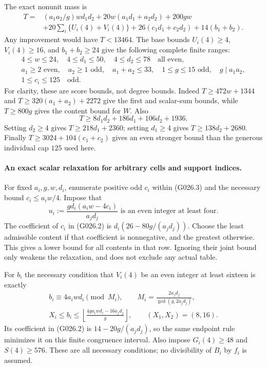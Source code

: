 The exact nonunit mass is
\[
 \begin{split}
 T={}&(a_1a_2/g)wd_1d_2+20w(a_1d_1+a_2d_2)+200gw\\
 &+20\sum_i\{U_i(4)+V_i(4)\}
       +26(c_1d_1+c_2d_2)+14(b_1+b_2).
 \end{split}                                                        \tag{G026.2}
\]
Any improvement would have $T<13464$. The base bounds
$U_i(4)\ge4$, $V_i(4)\ge16$, and $b_1+b_2\ge24$
give the following complete finite ranges:
\[
 \begin{gathered}
 4\le w\le24,\quad4\le d_1\le50,\quad4\le d_2\le78
       \quad\text{all even},\\
 a_1\ge2\text{ even},\quad a_2\ge1\text{ odd},\quad
 a_1+a_2\le33,\quad1\le g\le15\text{ odd},\quad g\mid a_1a_2,\\
 1\le c_i\le125\quad\text{odd}.
 \end{gathered}                                                       \tag{G026.3}
\]
For clarity, these are score bounds, not degree bounds.
Indeed $T\ge472w+1344$ and
$T\ge320(a_1+a_2)+2272$ give the first and scalar-sum
bounds, while $T\ge800g$ gives the content bound for $W$.
Also
\[
 T\ge8d_1d_2+186d_1+106d_2+1936.
\]
Setting $d_2\ge4$ gives $T\ge218d_1+2360$;
setting $d_1\ge4$ gives $T\ge138d_2+2680$.
Finally $T\ge3024+104(c_1+c_2)$ gives an even stronger
bound than the generous individual cap $125$ used here.

\paragraph{An exact scalar relaxation for arbitrary cells and support indices.}
For fixed $a_i,g,w,d_i$, enumerate positive odd $c_i$
within (G026.3) and the necessary bound $c_i\le a_iw/4$.
Impose that
\[
 u_i:=\frac{g d_i(a_iw-4c_i)}{a_jd_j}
              \text{ is an even integer at least four}.             \tag{G026.4}
\]
The coefficient of $c_i$ in (G026.2) is
$d_i(26-80g/(a_jd_j))$. Choose the least admissible content
if that coefficient is nonnegative, and the greatest
otherwise. This gives a lower bound for all contents in
that row. Ignoring their joint bound only weakens the
relaxation, and does not exclude any actual table.

For $b_i$ the necessary condition that $V_i(4)$ be an
even integer at least sixteen is exactly
\[
 \begin{gathered}
 b_i\equiv4a_iwd_i\pmod{M_i},\qquad
 M_i=\frac{2a_jd_j}{\gcd(g,2a_jd_j)},\\
 X_i\le b_i\le
 \left\lfloor\frac{4g a_iwd_i-16a_jd_j}{g}\right\rfloor,
 \qquad (X_1,X_2)=(8,16).
 \end{gathered}                                                       \tag{G026.5}
\]
Its coefficient in (G026.2) is $14-20g/(a_jd_j)$,
so the same endpoint rule minimizes it on this finite
congruence interval. Also impose $G_i(4)\ge48$ and
$S(4)\ge576$. These are all necessary conditions;
no divisibility of $B_i$ by $f_i$ is assumed.

